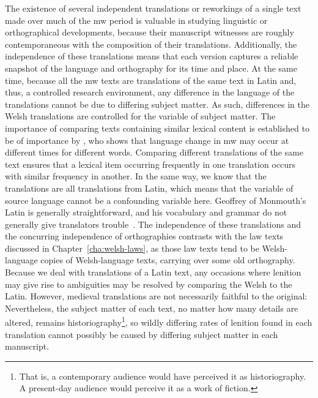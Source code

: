 The existence of several independent translations or reworkings of a single text made over much of the \gls{mw} period is valuable in studying linguistic or orthographical developments, because their manuscript witnesses are roughly contemporaneous with the composition of their translations.
Additionally, the independence of these translations means that each version captures a reliable snapshot of the language and orthography for its time and place.
At the same time, because all the \gls{mw} texts are translations of the same text in Latin and, thus, a controlled research environment,  any difference in the language of the translations cannot be due to differing subject matter.
As such, differences in the Welsh translations are controlled for the variable of subject matter.
The importance of comparing texts containing similar lexical content is established to be of importance by \textcite{Wil_Lexical05}, who shows that language change in \gls{mw} may occur at different times for different words.
Comparing different translations of the same text ensures that a lexical item occurring frequently in one translation  occurs with similar frequency in another.
In the same way, we know that the translations  are all translations from Latin, which means that the variable of source language cannot be a confounding variable here.
Geoffrey of Monmouth's Latin is generally straightforward, and his vocabulary and grammar do not generally give translators trouble~\autocite[lxxvi]{Geo_History09}.
The independence of these translations and the concurring independence of orthographies contrasts with the law texts discussed in Chapter~\ref{cha:welsh-laws}, as those law texts tend to be Welsh-language copies of Welsh-language texts, carrying over some old orthography.
Because we deal with translations of a Latin text, any occasions where lenition may give rise to ambiguities may be resolved by comparing the Welsh to the Latin.
However, medieval translations are not necessarily faithful to the original:
Nevertheless, the subject matter of each text, no matter how many details are altered, remains historiography\footnote{That is, a contemporary audience would have perceived it as historiography. A present-day audience would perceive it as a work of fiction.}, so wildly differing rates of lenition found in each translation cannot possibly be caused by differing subject matter  in each manuscript.

